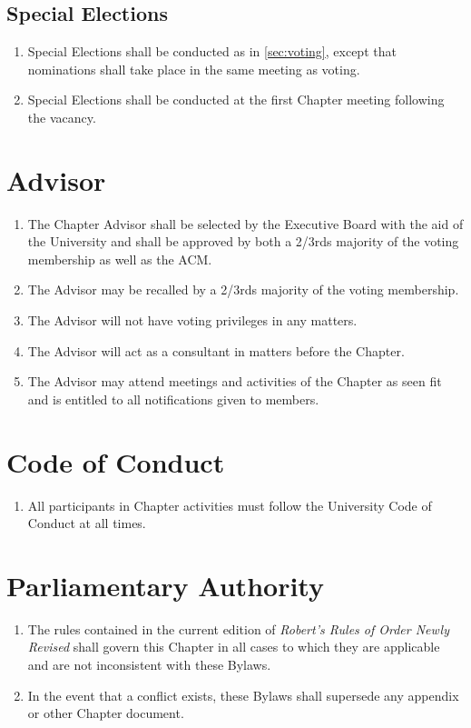 \documentclass[12pt, letterpaper, oneside]{book}
\begin{document}
\section{Special Elections} \label{sec:specialelections}
\begin{enumerate}
    \item Special Elections shall be conducted as in \cref{sec:voting}, except
        that nominations shall take place in the same meeting as voting.
    \item Special Elections shall be conducted at the first Chapter meeting
        following the vacancy.
\end{enumerate}

\chapter{Advisor}
\begin{enumerate}
    \item The Chapter Advisor shall be selected by the Executive Board with the
        aid of the University and shall be approved by both a 2/3rds majority of
        the voting membership as well as the ACM.
    \item The Advisor may be recalled by a 2/3rds majority of the voting
        membership.
    \item The Advisor will not have voting privileges in any matters.
    \item The Advisor will act as a consultant in matters before the Chapter.
    \item The Advisor may attend meetings and activities of the Chapter as seen
        fit and is entitled to all notifications given to members.
\end{enumerate}

\chapter{Code of Conduct}
\begin{enumerate}
    \item All participants in Chapter activities must follow the University Code
        of Conduct at all times.
\end{enumerate}

\chapter{Parliamentary Authority}
\begin{enumerate}
    \item The rules contained in the current edition of \emph{Robert's Rules of
        Order Newly Revised} shall govern this Chapter in all cases to which
        they are applicable and are not inconsistent with these Bylaws.
    \item In the event that a conflict exists, these Bylaws shall supersede any
        appendix or other Chapter document.
\end{enumerate}
\end{document}
